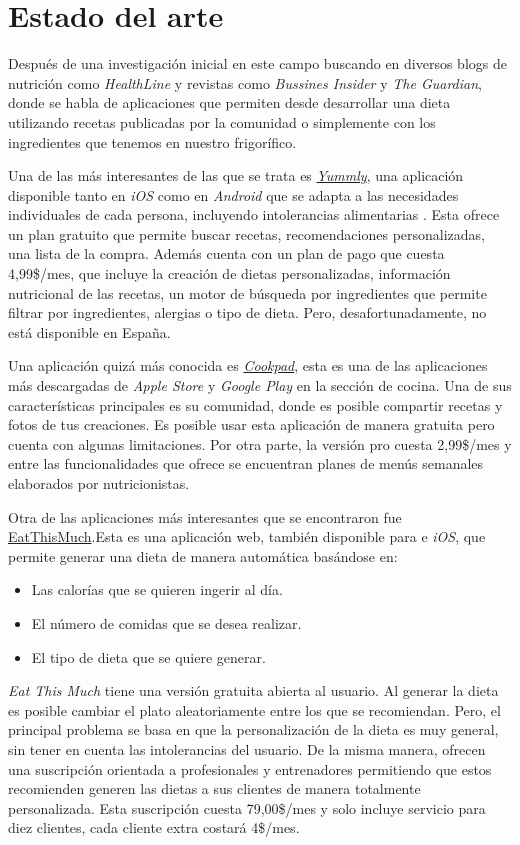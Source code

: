 \chapter{Estado del arte}
Después de una investigación inicial en este campo buscando en diversos blogs de nutrición como \emph{HealthLine}\cite{Healthline2022} y revistas como \emph{Bussines Insider}\cite{BusinessInsider2021} y \emph{The Guardian}, donde se habla de aplicaciones que permiten desde desarrollar una dieta utilizando recetas publicadas por la comunidad o simplemente con los ingredientes que tenemos en nuestro frigorífico. 

Una de las más interesantes de las que se trata es \href{https://www.yummly.com}{\emph{Yummly}}, una aplicación disponible tanto en \emph{iOS} como en \emph{Android} que se adapta a las necesidades individuales de cada persona, incluyendo intolerancias alimentarias \cite{TheGuardian2016}. Esta ofrece un plan gratuito que permite buscar recetas, recomendaciones personalizadas, una lista de la compra. Además cuenta con un plan de pago que cuesta 4,99\$/mes, que incluye la creación de dietas personalizadas, información nutricional de las recetas, un motor de búsqueda por ingredientes que permite filtrar por ingredientes, alergias o tipo de dieta. Pero, desafortunadamente, no está disponible en España. 

Una aplicación quizá más conocida es \href{https://cookpad.com/es/home}{\emph{Cookpad}}, esta es una de las aplicaciones más descargadas de \emph{Apple Store} y \emph{Google Play} en la sección de cocina. Una de sus características principales es su comunidad, donde es posible compartir recetas y fotos de tus creaciones. Es posible usar esta aplicación de manera gratuita pero cuenta con algunas limitaciones. Por otra parte, la versión pro cuesta 2,99\$/mes y entre las funcionalidades que ofrece se encuentran planes de menús semanales elaborados por nutricionistas.

Otra de las aplicaciones más interesantes que se encontraron fue \href{https://www.eatthismuch.com/}{EatThisMuch}.Esta es una aplicación web, también disponible para  e \emph{iOS}, que permite generar una dieta de manera automática basándose en:
\begin{itemize}
    \item Las calorías que se quieren ingerir al día.
    \item El número de comidas que se desea realizar.
    \item El tipo de dieta que se quiere generar.
\end{itemize}
\emph{Eat This Much} tiene una versión gratuita abierta al usuario. Al generar la dieta es posible cambiar el plato aleatoriamente entre los que se recomiendan. Pero, el principal problema se basa en que la personalización de la dieta es muy general, sin tener en cuenta las intolerancias del usuario. De la misma manera, ofrecen una suscripción orientada a profesionales y entrenadores permitiendo que estos recomienden generen las dietas a sus clientes de manera totalmente personalizada. Esta suscripción cuesta 79,00\$/mes y solo incluye servicio para diez clientes, cada cliente extra costará 4\$/mes. 

